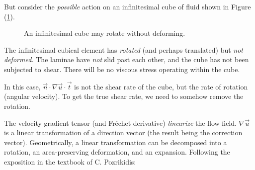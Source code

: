 \documentclass[12pt, a4paper, twoside, openright]{book}
\begin{document}
But consider the \emph{possible} action on an infinitesimal cube of fluid shown in Figure (\ref{cuberotates}).
\begin{figure}[ht]
\centering
{}
\caption{An infinitesimal cube may rotate without deforming.}\label{cuberotates}
\end{figure}

The infinitesimal cubical element has \emph{rotated} (and perhaps translated) but \emph{not deformed.}
The laminae have \emph{not} slid past each other, and the cube has not been subjected to shear.  There will be no viscous stress operating within the cube.

In this case, $ \vec{n} \cdot \nabla \vec{u} \cdot \vec{t}$ is not the shear rate of the cube, but the rate of rotation (angular velocity).  To get the true shear rate, we need to somehow remove the rotation.

The velocity gradient tensor (and Fr\'{e}chet derivative) \emph{linearize} the flow field. $\nabla \vec{u}$ is a linear transformation of a direction vector (the result being the correction vector).  Geometrically, a linear transformation can be decomposed into a rotation, an area-preserving deformation, and an expansion.  Following the exposition in the textbook \cite{Pozrikidis1997} of C. Pozrikidis:
\end{document}
